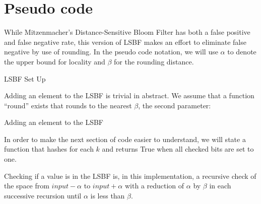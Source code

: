 \section{Pseudo code}

While Mitzenmacher's Distance-Sensitive Bloom Filter has both a false positive and false negative rate, this version of LSBF makes an effort to eliminate false negative by use of rounding. In the pseudo code notation, we will use $\alpha$ to denote the upper bound for locality and $\beta$ for the rounding distance.

\begin{algorithm}[H]
	\caption{LSBF Set Up}
\end{algorithm}

Adding an element to the LSBF is trivial in abstract. We assume that a function ``round'' exists that rounds to the nearest $\beta$, the second parameter:

\begin{algorithm}[H]
\caption{Adding an element to the LSBF}
\end{algorithm}

In order to make the next section of code easier to understand, we will state a function that hashes for each $k$ and returns True when all checked bits are set to one.

Checking if a value is in the LSBF is, in this implementation, a recursive check of the space from $input - \alpha$ to $input + \alpha$ with a reduction of $\alpha$ by $\beta$ in each successive recursion until $\alpha$ is less than $\beta$.

\begin{algorithm}
\end{algorithm}
